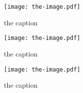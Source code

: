 \documentclass{book}
\begin{document}
\begin{figure}
\centering
\texttt{[image: the-image.pdf]}
\captionsetup{aboveskip=1em,belowskip=1em}
\caption[the title]{the caption}
\end{figure}

\begin{figure}
\centering
\texttt{[image: the-image.pdf]}
\captionsetup{aboveskip=1em,belowskip=1em}
\caption[the title]{the caption}
\end{figure}

\begin{figure}
\centering
\texttt{[image: the-image.pdf]}
\captionsetup{aboveskip=1em,belowskip=1em}
\caption[the title]{the caption}
\end{figure}
\end{document}
